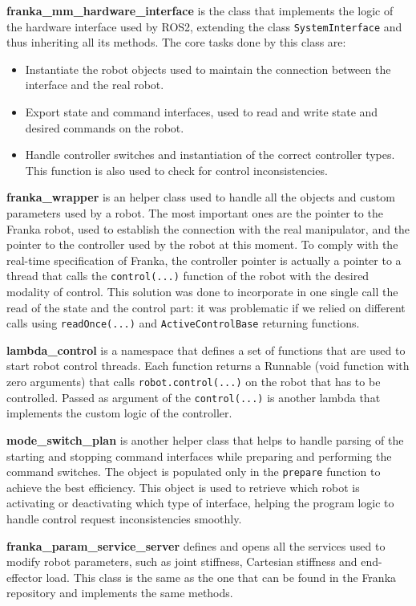 \documentclass{article}
\begin{document}
\textbf{franka\_mm\_hardware\_interface} is the class that implements the logic of the hardware interface used by ROS2, extending the class \texttt{SystemInterface} and thus inheriting all its methods. The core tasks done by this class are: 
\begin{itemize}
    \item Instantiate the robot objects used to maintain the connection between the interface and the real robot.
    \item Export state and command interfaces, used to read and write state and desired commands on the robot.
    \item Handle controller switches and instantiation of the correct controller types. This function is also used to check for control inconsistencies.
\end{itemize}

\textbf{franka\_wrapper} is an helper class used to handle all the objects and custom parameters used by a robot. The most important ones are the pointer to the Franka robot, used to establish the connection with the real manipulator, and the pointer to the controller used by the robot at this moment. To comply with the real-time specification of Franka, the controller pointer is actually a pointer to a thread that calls the \texttt{control(...)} function of the robot with the desired modality of control. This solution was done to incorporate in one single call the read of the state and the control part: it was problematic if we relied on different calls using \texttt{readOnce(...)} and \texttt{ActiveControlBase} returning functions.

\textbf{lambda\_control} is a namespace that defines a set of functions that are used to start robot control threads. Each function returns a Runnable (void function with zero arguments) that calls \texttt{robot.control(...)} on the robot that has to be controlled. Passed as argument of the \texttt{control(...)} is another lambda that implements the custom logic of the controller.

\textbf{mode\_switch\_plan} is another helper class that helps to handle parsing of the starting and stopping command interfaces while preparing and performing the command switches. The object is populated only in the \texttt{prepare} function to achieve the best efficiency. This object is used to retrieve which robot is activating or deactivating which type of interface, helping the program logic to handle control request inconsistencies smoothly.

\textbf{franka\_param\_service\_server} defines and opens all the services used to modify robot parameters, such as joint stiffness, Cartesian stiffness and end-effector load. This class is the same as the one that can be found in the Franka repository and implements the same methods. \\
\end{document}
